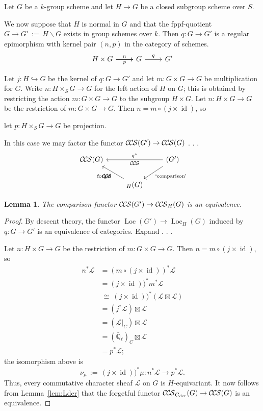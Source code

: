 \documentclass[10pt]{amsart}
\theoremstyle{plain}
\newtheorem{lemma}[theorem]{Lemma}
\theoremstyle{definition}
\newcommand{\EE}{\mathbb{\bar Q}_\ell}
\newcommand{\Fq}{k}
\DeclareMathOperator{\id}{id}
\DeclareMathOperator{\Loc}{Loc}
\newcommand{\der}{_{\operatorname{der}}}
\newcommand{\ab}{_{\operatorname{ab}}}
\newcommand{\ceq}{{\, :=\, }}
\newcommand{\iso}{{\ \cong\ }}
\newcommand{\cs}[1]{{\mathcal{#1}}}
\newcommand{\CCS}{{\mathcal{C\hskip-.8pt C\hskip-0.8pt S}}}
\begin{document}
Let $G$ be a $k$-group scheme and let $H \to G$ be a closed subgroup scheme over $S$.

We now suppose that $H$ is normal in $G$ and that the fppf-quotient $G \to G'\ceq H\backslash G$ exists in group schemes over $\Fq$.
Then $q : G \to G'$ is a regular epimorphism with kernel pair $(n,p)$ in the category of schemes.
\[
\begin{tikzcd}
H\times G
 \arrow{r}[shift left]{n}
  \arrow{r}[shift right,swap]{p}
&
G 
\arrow{r}{q}
& 
G'
\end{tikzcd}
\]

Let $j : H \hookrightarrow G$ be the kernel of $q : G \to G'$ and let $m : G\times G \to G$ be multiplication for $G$. 
Write $n : H \times_S G \to G$ for the left action of $H$ on $G$; this is obtained by restricting the action $m : G\times G\to G$ to the subgroup $H\times G$. 
Let $n : H \times G \to G$ be the restriction of $m: G\times G \to G$.
Then $n = m \circ (j \times \id)$, so


 let $p : H\times_S G \to G$ be projection.



In this case we may factor the functor $\CCS(G') \to \CCS(G)$  . . . 
\[
\begin{tikzcd}
\CCS(G) &&\arrow{ll}[swap]{q^*} 
\CCS(G') \arrow{dl}{\text{`comparison'}}\\
& \arrow{ul}{\text{forget}} \CCS_{H}(G) & 
\end{tikzcd}
\]

\begin{lemma}\label{lem:descent}
The comparison functor $\CCS(G') \to \CCS_{H}(G)$ is an equivalence.
\end{lemma}  
  
\begin{proof}
By descent theory, the functor $\Loc(G') \to \Loc_H(G)$ induced by $q: G \to G'$ is an equivalence of categories. Expand . . . 

Let $n : H \times G \to G$ be the restriction of $m: G\times G \to G$.
Then $n = m \circ (j \times \id)$, so
\begin{align*}
n^* \cs{L} 
&= (m \circ (j \times \id))^* \cs{L}\\
&= (j \times \id))^* m^*\cs{L}\\
&\iso (j \times \id))^* (\cs{L} \boxtimes \cs{L})\\
&= (j^*\cs{L}) \boxtimes \cs{L}\\
&= (\cs{L}\vert_C) \boxtimes \cs{L}\\
&= (\EE)_C \boxtimes \cs{L}\\
&= p^* \cs{L};
\end{align*}
the isomorphism above is 
\[
\nu_\mu \ceq(j \times \id))^* \mu: n^*\cs{L} \to p^*\cs{L}.
\]
Thus, every commutative character sheaf $\cs{L}$ on $G$ is $H$-equivariant.
It now follows from Lemma~\ref{lem:Lder} that the forgetful functor $\CCS_{G\der}(G) \to \CCS(G)$ is an equivalence. 
\end{proof}
\end{document}
